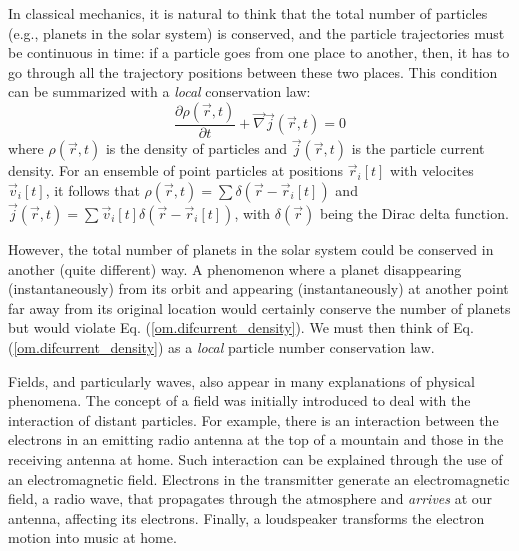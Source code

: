 \documentclass[onecolumn,nofootinbib, secnumarabic, amsmath, nobibnotes,11pt,aps,pra]{revtex4-1}
\newcommand{\eref}[1]{Eq. (\ref{#1})}
\begin{document}
In classical mechanics, it is natural to think that the total number
of particles (e.g., planets in the solar system) is conserved, and
the particle trajectories must be continuous in time: if a particle
goes from one place to another, then, it  has to go through all the trajectory
positions between these two places. This condition can be summarized
with a \textit{local} conservation law:
\begin{equation}
\label{om.difcurrent_density}
\frac{\partial\rho(\vec{r},t)}{\partial t} + \vec{\nabla} \vec{j}(\vec{r},t) = 0
\end{equation}
where $\rho(\vec{r},t)$ is the density of particles and
$\vec{j}(\vec{r},t)$ is the particle current density. For an
ensemble of point particles at positions $\vec{r}_i[t]$ with
velocites $\vec{v}_i[t]$, it follows that $\rho(\vec{r},t) =
\sum\delta(\vec{r}-\vec{r}_{i}[t])$ and $\vec{j}(\vec{r},t) =
\sum\vec{v}_{i}[t] \delta(\vec{r}-\vec{r}_{i}[t])$, with
$\delta(\vec{r})$ being the Dirac delta function.

However, the total number of planets in the solar system could be conserved in another (quite different) way.
A phenomenon where a planet disappearing (instantaneously) from its orbit and appearing (instantaneously) at another point far away from its original location would certainly conserve the number of planets but would violate \eref{om.difcurrent_density}. We must then think of \eref{om.difcurrent_density} as a \textit{local} particle number conservation law.

Fields, and particularly waves, also appear in many explanations of
physical phenomena. The concept of a field was initially introduced
to deal with the interaction of distant particles.  For example,
there is an interaction between the electrons in an emitting radio
antenna at the top of a mountain and those in the receiving antenna
at home. Such interaction can be explained through the use of an
electromagnetic field. Electrons in the transmitter generate an
electromagnetic field, a radio wave, that propagates through the
atmosphere and \textit{arrives} at our antenna, affecting its
electrons. Finally, a loudspeaker transforms the electron motion
into music at home.
\end{document}
